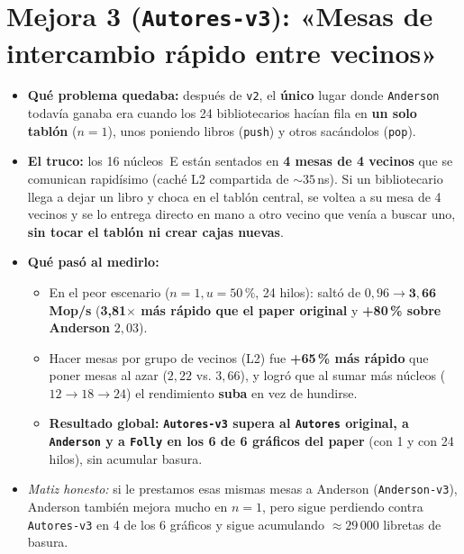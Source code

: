 \documentclass[11pt,a4paper]{article}
\begin{document}
\section*{Mejora 3 (\texttt{Autores-v3}): «Mesas de intercambio rápido entre vecinos»}
\begin{itemize}
  \item \textbf{Qué problema quedaba:} después de \texttt{v2}, el \textbf{único} lugar donde \texttt{Anderson} todavía ganaba era cuando los 24 bibliotecarios hacían fila en \textbf{un solo tablón} ($n = 1$), unos poniendo libros (\texttt{push}) y otros sacándolos (\texttt{pop}).
  \item \textbf{El truco:} los 16 núcleos~E están sentados en \textbf{4 mesas de 4 vecinos} que se comunican rapidísimo (caché L2 compartida de $\sim 35$\,ns). Si un bibliotecario llega a dejar un libro y choca en el tablón central, se voltea a su mesa de 4 vecinos y se lo entrega directo en mano a otro vecino que venía a buscar uno, \textbf{sin tocar el tablón ni crear cajas nuevas}.
  \item \textbf{Qué pasó al medirlo:}
  \begin{itemize}
    \item En el peor escenario ($n = 1, u = 50\,\%$, 24 hilos): saltó de $0{,}96 \to \mathbf{3{,}66}$\textbf{\,Mop/s} (\textbf{3{,}81$\times$ más rápido que el paper original} y \textbf{+80\,\% sobre Anderson} $2{,}03$).
    \item Hacer mesas por grupo de vecinos (L2) fue \textbf{+65\,\% más rápido} que poner mesas al azar ($2{,}22$ vs. $3{,}66$), y logró que al sumar más núcleos ($12 \to 18 \to 24$) el rendimiento \textbf{suba} en vez de hundirse.
    \item \textbf{Resultado global:} \textbf{\texttt{Autores-v3} supera al \texttt{Autores} original, a \texttt{Anderson} y a \texttt{Folly} en los 6 de 6 gráficos del paper} (con 1 y con 24 hilos), sin acumular basura.
  \end{itemize}
  \item \emph{Matiz honesto:} si le prestamos esas mismas mesas a Anderson (\texttt{Anderson-v3}), Anderson también mejora mucho en $n = 1$, pero sigue perdiendo contra \texttt{Autores-v3} en 4 de los 6 gráficos y sigue acumulando $\approx 29\,000$ libretas de basura.
\end{itemize}
\end{document}

